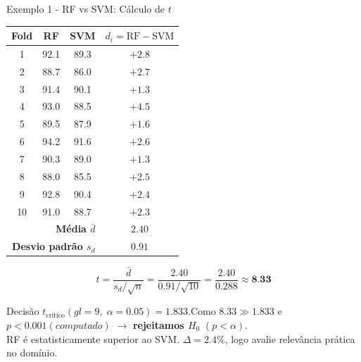 \documentclass[aspectratio=169]{beamer}
\begin{document}
\begin{frame}[shrink=10]{Exemplo 1 - RF vs SVM: Cálculo de $t$}
    \begin{center}\footnotesize
    \begin{tabular}{cccc}
    \toprule
    Fold & RF & SVM & $d_i = \text{RF}-\text{SVM}$ \\
    \midrule
    1  & 92{.}1 & 89{.}3 & $+2{.}8$ \\
    2  & 88{.}7 & 86{.}0 & $+2{.}7$ \\
    3  & 91{.}4 & 90{.}1 & $+1{.}3$ \\
    4  & 93{.}0 & 88{.}5 & $+4{.}5$ \\
    5  & 89{.}5 & 87{.}9 & $+1{.}6$ \\
    6  & 94{.}2 & 91{.}6 & $+2{.}6$ \\
    7  & 90{.}3 & 89{.}0 & $+1{.}3$ \\
    8  & 88{.}0 & 85{.}5 & $+2{.}5$ \\
    9  & 92{.}8 & 90{.}4 & $+2{.}4$ \\
    10 & 91{.}0 & 88{.}7 & $+2{.}3$ \\
    \midrule
    \multicolumn{3}{r}{\textbf{Média $\bar{d}$}} & $2{.}40$ \\
    \multicolumn{3}{r}{\textbf{Desvio padrão $s_d$}} & $0{.}91$ \\
    \bottomrule
    \end{tabular}
    \end{center}
    \pause
    \[
      t = \frac{\bar{d}}{s_d/\sqrt{n}} = \frac{2{.}40}{0{.}91/\sqrt{10}} = \frac{2{.}40}{0{.}288} \approx \mathbf{8{.}33}
    \]
    \pause
    \begin{alertblock}{Decisão}
        \footnotesize $t_{\text{crítico}}(gl=9,\;\alpha=0{.}05) = 1{.}833$.\quad Como $8{.}33 \gg 1{.}833$ e $p < 0{.}001 (computado)$ $\rightarrow$ \textbf{rejeitamos $H_0$} $(p <\alpha)$.\\
        RF é estatisticamente superior ao SVM. $\Delta = 2{.}4\%$, logo avalie relevância prática no domínio.
    \end{alertblock}
\end{frame}
\end{document}

